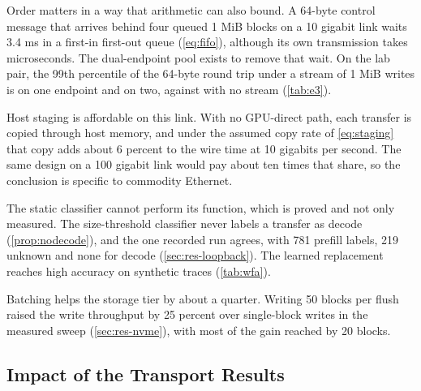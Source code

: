 Order matters in a way that arithmetic can also bound. A 64-byte
control message that arrives behind four queued 1 MiB blocks on a 10 gigabit
link waits 3.4 ms in a first-in first-out queue (\cref{eq:fifo}), although
its own transmission takes microseconds. The dual-endpoint pool exists to
remove that wait. On the lab pair, the 99th percentile of the 64-byte round
trip under a stream of 1 MiB writes is \blank\us{} on one endpoint and
\blank\us{} on two, against \blank\us{} with no stream (\cref{tab:e3}).

Host staging is affordable on this link. With no GPU-direct path,
each transfer is copied through host memory, and under the assumed copy rate
of \cref{eq:staging} that copy adds about 6 percent to the wire time at 10
gigabits per second. The same design on a 100 gigabit link would pay about
ten times that share, so the conclusion is specific to commodity Ethernet.

The static classifier cannot perform its function, which is proved and not
only measured. The size-threshold classifier never labels a transfer
as decode (\cref{prop:nodecode}), and the one recorded run agrees, with 781
prefill labels, 219 unknown and none for decode (\cref{sec:res-loopback}).
The learned replacement reaches high accuracy on synthetic traces
(\cref{tab:wfa}).

Batching helps the storage tier by about a quarter. Writing 50
blocks per flush raised the write throughput by 25 percent over single-block
writes in the measured sweep (\cref{sec:res-nvme}), with most of the gain
reached by 20 blocks.

\subsection{Impact of the Transport Results}
\label{sec:impact-transport}



